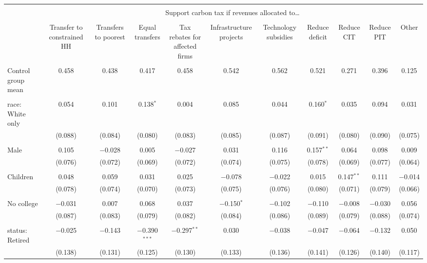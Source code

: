 
\begin{tabular}{@{\extracolsep{5pt}}lcccccccccc} 
\\[-1.8ex]\hline 
\hline \\[-1.8ex] 
 & \multicolumn{10}{c}{Support carbon tax if revenues allocated to…} \\ 
\cline{2-11} 
\\[-1.8ex] & Transfer to constrained HH & Transfers to poorest & Equal transfers & Tax rebates for affected firms & Infrastructure projects & Technology subsidies & Reduce deficit & Reduce CIT & Reduce PIT & Other \\ 
\hline \\[-1.8ex] 
 Control group mean & 0.458 & 0.438 & 0.417 & 0.458 & 0.542 & 0.562 & 0.521 & 0.271 & 0.396 & 0.125  \\ \hline \\[-1.8ex] race: White only & 0.054 & 0.101 & 0.138$^{*}$ & 0.004 & 0.085 & 0.044 & 0.160$^{*}$ & 0.035 & 0.094 & 0.031 \\ 
  & (0.088) & (0.084) & (0.080) & (0.083) & (0.085) & (0.087) & (0.091) & (0.080) & (0.090) & (0.075) \\ 
  & & & & & & & & & & \\ 
 Male & 0.105 & $-$0.028 & 0.005 & $-$0.027 & 0.031 & 0.116 & 0.157$^{**}$ & 0.064 & 0.098 & 0.009 \\ 
  & (0.076) & (0.072) & (0.069) & (0.072) & (0.074) & (0.075) & (0.078) & (0.069) & (0.077) & (0.064) \\ 
  & & & & & & & & & & \\ 
 Children & 0.048 & 0.059 & 0.031 & 0.025 & $-$0.078 & $-$0.022 & 0.015 & 0.147$^{**}$ & 0.111 & $-$0.014 \\ 
  & (0.078) & (0.074) & (0.070) & (0.073) & (0.075) & (0.076) & (0.080) & (0.071) & (0.079) & (0.066) \\ 
  & & & & & & & & & & \\ 
 No college & $-$0.031 & 0.007 & 0.068 & 0.037 & $-$0.150$^{*}$ & $-$0.102 & $-$0.110 & $-$0.008 & $-$0.030 & 0.056 \\ 
  & (0.087) & (0.083) & (0.079) & (0.082) & (0.084) & (0.086) & (0.089) & (0.079) & (0.088) & (0.074) \\ 
  & & & & & & & & & & \\ 
 status: Retired & $-$0.025 & $-$0.143 & $-$0.390$^{***}$ & $-$0.297$^{**}$ & 0.030 & $-$0.038 & $-$0.047 & $-$0.064 & $-$0.132 & 0.050 \\ 
  & (0.138) & (0.131) & (0.125) & (0.130) & (0.133) & (0.136) & (0.141) & (0.126) & (0.140) & (0.117) \\ 

\end{tabular}
